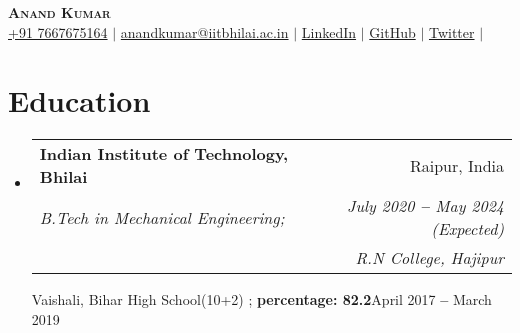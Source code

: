 \documentclass[letterpaper,11pt]{article}
\makeatletter
\newcommand{\resumeItem}[1]{
  \item\small{
    {#1 \vspace{-2pt}}
  }
}
\newcommand{\resumeSubheading}[4]{
  \vspace{-2pt}\item
    \begin{tabular*}{0.97\textwidth}[t]{l@{\extracolsep{\fill}}r}
      \textbf{#1} & #2 \\
      \textit{\small#3} & \textit{\small #4} \\
    \end{tabular*}\vspace{-7pt}
}
\newcommand{\resumeEducationHeading}[6]{
  \vspace{-2pt}\item
    \begin{tabular*}{0.97\textwidth}[t]{l@{\extracolsep{\fill}}r}
      \textbf{#1} & #2 \\
      \textit{\small#3} & \textit{\small #4} \\
      \textit{\small#5} & \textit{\small #6} \\
    \end{tabular*}\vspace{-5pt}
}
\newcommand{\resumeSubHeadingListStart}{\begin{itemize}[leftmargin=0.15in, label={}]}
\newcommand{\resumeSubHeadingListEnd}{\end{itemize}}
\newcommand{\resumeItemListStart}{\begin{itemize}}
\newcommand{\resumeItemListEnd}{\end{itemize}\vspace{-5pt}}
\makeatother
\begin{document}

\begin{center}
    \textbf{\Huge \scshape Anand Kumar} \\ \vspace{3pt}
    \small
    \faMobile \hspace{.5pt} \href{tel:917667675164}{+91 7667675164}
    $|$
    \faAt \hspace{.5pt} \href{mailto:anandkumar@iitbhilai.ac.in}{anandkumar@iitbhilai.ac.in}
    $|$
    \faLinkedinSquare \hspace{.5pt} \href{https://www.linkedin.com/in/anand-kumar2024/}{LinkedIn}
    $|$
    \faGithub \hspace{.5pt} \href{https://github.com/AnandK-2024}{GitHub}
    $|$
    \faGlobe \hspace{.5pt} \href{https://twitter.com/AnandK1024}{Twitter}
    $|$
    \faMapMarker \hspace{.5pt}{Raipur, India}
\end{center}




\section{Education}
  \vspace{3pt}
  \resumeSubHeadingListStart
    
    \resumeEducationHeading
      {Indian Institute of Technology, Bhilai
      }{Raipur, India}
      {B.Tech in Mechanical Engineering;   }{July 2020 \textbf{--} May 2024 (Expected)}
      
    
    \resumeSubheading
      {R.N College, Hajipur
      }{Vaishali, Bihar}
      {High School(10+2) ;   \textbf{percentage: 82.2}}{April 2017 \textbf{--} March 2019}
    
  \resumeSubHeadingListEnd
\end{document}
